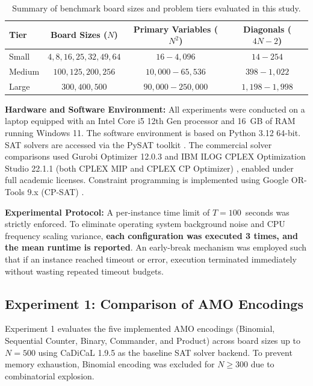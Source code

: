 \documentclass[a4paper,fleqn]{cas-sc}
\begin{document}
\begin{table}[pos=!htb]
\centering\footnotesize
\renewcommand{\arraystretch}{0.82}
\caption{Summary of benchmark board sizes and problem tiers evaluated in this study.}
\label{tab:benchmarks_summary}
\begin{tabular}{lccc}
\toprule
\textbf{Tier} & \textbf{Board Sizes ($N$)} & \textbf{Primary Variables ($N^2$)} & \textbf{Diagonals ($4N-2$)} \\
\midrule
Small  & $4, 8, 16, 25, 32, 49, 64$ & $16 - 4,096$        & $14 - 254$ \\
Medium & $100, 125, 200, 256$       & $10,000 - 65,536$   & $398 - 1,022$ \\
Large  & $300, 400, 500$            & $90,000 - 250,000$  & $1,198 - 1,998$ \\
\bottomrule
\end{tabular}
\end{table}

\noindent\textbf{Hardware and Software Environment:} All experiments were conducted on a laptop equipped with an Intel Core i5 12th Gen processor and 16~GB of RAM running Windows 11. The software environment is based on Python 3.12 64-bit. SAT solvers are accessed via the PySAT toolkit \cite{imms2018pysat}. The commercial solver comparisons used Gurobi Optimizer 12.0.3 \cite{gurobi} and IBM ILOG CPLEX Optimization Studio 22.1.1 (both CPLEX MIP and CPLEX CP Optimizer) \cite{cplex}, enabled under full academic licenses. Constraint programming is implemented using Google OR-Tools 9.x (CP-SAT) \cite{ortools}.

\noindent\textbf{Experimental Protocol:} A per-instance time limit of $T = 100$~seconds was strictly enforced. To eliminate operating system background noise and CPU frequency scaling variance, \textbf{each configuration was executed 3 times, and the mean runtime is reported}. An early-break mechanism was employed such that if an instance reached timeout or error, execution terminated immediately without wasting repeated timeout budgets.

\subsection{Experiment 1: Comparison of AMO Encodings}
\label{sec:exp1_results}

Experiment 1 evaluates the five implemented AMO encodings (Binomial, Sequential Counter, Binary, Commander, and Product) across board sizes up to $N = 500$ using CaDiCaL 1.9.5 as the baseline SAT solver backend. To prevent memory exhaustion, Binomial encoding was excluded for $N \ge 300$ due to combinatorial explosion.
\end{document}
